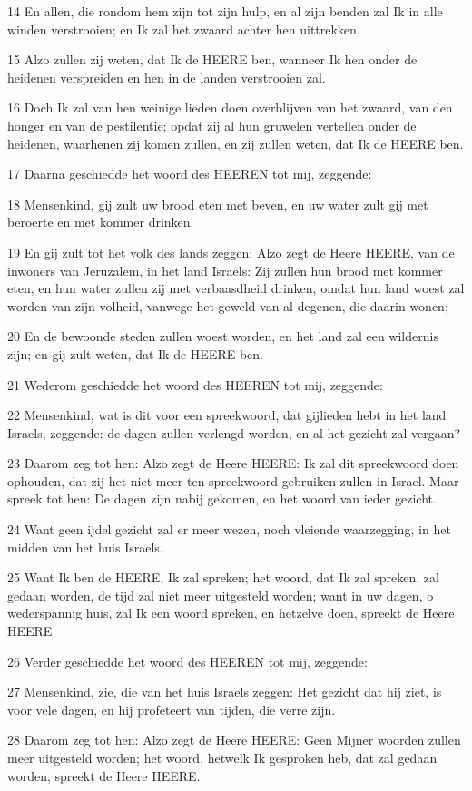 \par 14 En allen, die rondom hem zijn tot zijn hulp, en al zijn benden zal Ik in alle winden verstrooien; en Ik zal het zwaard achter hen uittrekken.
\par 15 Alzo zullen zij weten, dat Ik de HEERE ben, wanneer Ik hen onder de heidenen verspreiden en hen in de landen verstrooien zal.
\par 16 Doch Ik zal van hen weinige lieden doen overblijven van het zwaard, van den honger en van de pestilentie; opdat zij al hun gruwelen vertellen onder de heidenen, waarhenen zij komen zullen, en zij zullen weten, dat Ik de HEERE ben.
\par 17 Daarna geschiedde het woord des HEEREN tot mij, zeggende:
\par 18 Mensenkind, gij zult uw brood eten met beven, en uw water zult gij met beroerte en met kommer drinken.
\par 19 En gij zult tot het volk des lands zeggen: Alzo zegt de Heere HEERE, van de inwoners van Jeruzalem, in het land Israels: Zij zullen hun brood met kommer eten, en hun water zullen zij met verbaasdheid drinken, omdat hun land woest zal worden van zijn volheid, vanwege het geweld van al degenen, die daarin wonen;
\par 20 En de bewoonde steden zullen woest worden, en het land zal een wildernis zijn; en gij zult weten, dat Ik de HEERE ben.
\par 21 Wederom geschiedde het woord des HEEREN tot mij, zeggende:
\par 22 Mensenkind, wat is dit voor een spreekwoord, dat gijlieden hebt in het land Israels, zeggende: de dagen zullen verlengd worden, en al het gezicht zal vergaan?
\par 23 Daarom zeg tot hen: Alzo zegt de Heere HEERE: Ik zal dit spreekwoord doen ophouden, dat zij het niet meer ten spreekwoord gebruiken zullen in Israel. Maar spreek tot hen: De dagen zijn nabij gekomen, en het woord van ieder gezicht.
\par 24 Want geen ijdel gezicht zal er meer wezen, noch vleiende waarzegging, in het midden van het huis Israels.
\par 25 Want Ik ben de HEERE, Ik zal spreken; het woord, dat Ik zal spreken, zal gedaan worden, de tijd zal niet meer uitgesteld worden; want in uw dagen, o wederspannig huis, zal Ik een woord spreken, en hetzelve doen, spreekt de Heere HEERE.
\par 26 Verder geschiedde het woord des HEEREN tot mij, zeggende:
\par 27 Mensenkind, zie, die van het huis Israels zeggen: Het gezicht dat hij ziet, is voor vele dagen, en hij profeteert van tijden, die verre zijn.
\par 28 Daarom zeg tot hen: Alzo zegt de Heere HEERE: Geen Mijner woorden zullen meer uitgesteld worden; het woord, hetwelk Ik gesproken heb, dat zal gedaan worden, spreekt de Heere HEERE.

